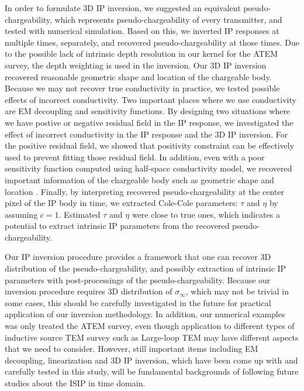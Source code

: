 \documentclass[a4paper, 11pt]{article}
\newcommand{\siginf}{\sigma_\infty}
\begin{document}
In order to formulate 3D IP inversion, we suggested an equivalent pseudo-chargeability, which represents pseudo-chargeability of every transmitter, and tested with numerical simulation. 
Based on this, we inverted IP responses at multiple times, separately, and recovered pseudo-chargeability at those times.
Due to the possible lack of intrinsic depth resolution in our kernel for the ATEM survey, the depth weighting is used in the inversion.  
Our 3D IP inversion recovered reasonable geometric shape and location of the chargeable body. 
Because we may not recover true conductivity in practice, we tested possible effects of incorrect conductivity. 
Two important places where we use conductivity are EM decoupling and sensitivity functions. 
By designing two situations where we have postive or negative residual field in the IP response, we investigated the effect of incorrect conductivity in the IP response and the 3D IP inversion. 
For the positive residual field, we showed that positivity constraint can be effectively used to prevent fitting those residual field. 
In addition, even with a poor sensitivity function computed using half-space conductivity model, we recovered important information of the chargeable body such as geometric shape and location . 
Finally, by interpreting recovered pseudo-chargeability at the center pixel of the IP body in time, we extracted Cole-Cole parameters: $\tau$ and $\eta$ by assuming $c=1$. 
Estimated $\tau$ and $\eta$ were close to true ones, which indicates a potential to extract intrinsic IP parameters from the recovered pseudo-chargeability.  

Our IP inversion procedure provides a framework that one can recover 3D distribution of the pseudo-chargeability, and possibly extraction of intrinsic IP parameters with post-processings of the pseudo-chargeability. 
Because our inversion procedure requires 3D distribution of $\siginf$, which may not be trivial in some cases, this should be carefully investigated in the future for practical application of our inversion methodology. 
In addition, our numerical examples was only treated the ATEM survey, even though application to different types of inductive source TEM survey such as Large-loop TEM may have different aspects that we need to consider. 
However, still important items including EM decoupling, linearization and 3D IP inversion, which have been come up with and carefully tested in this study, will be fundamental backgrounds of following future studies about the ISIP in time domain. 

\end{document}

